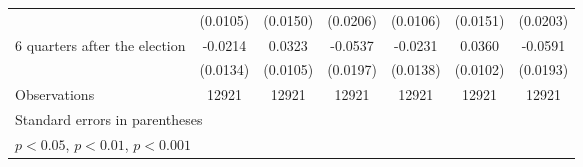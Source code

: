 \begin{table}[htbp]
\begin{tabular}{l*{6}{c}}
                    &    (0.0105)         &    (0.0150)         &    (0.0206)         &    (0.0106)         &    (0.0151)         &    (0.0203)         \\
[1em]
 6 quarters after the election&     -0.0214         &      0.0323\sym{**} &     -0.0537\sym{**} &     -0.0231         &      0.0360\sym{***}&     -0.0591\sym{**} \\
                    &    (0.0134)         &    (0.0105)         &    (0.0197)         &    (0.0138)         &    (0.0102)         &    (0.0193)         \\
\hline
Observations        &       12921         &       12921         &       12921         &       12921         &       12921         &       12921         \\
\hline\hline
\multicolumn{7}{l}{\footnotesize Standard errors in parentheses}\\
\multicolumn{7}{l}{\footnotesize \sym{*} \(p<0.05\), \sym{**} \(p<0.01\), \sym{***} \(p<0.001\)}\\
\end{tabular}
\end{table}
